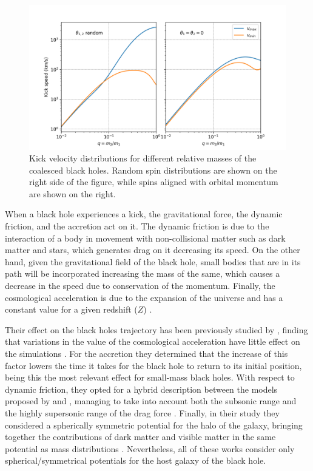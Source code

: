 	\begin{figure}[h]
		\centering
		\includegraphics[width=0.9\linewidth]{"../Files/Week 10/Tanaka"}
		\caption{Kick velocity distributions for different relative masses of the coalesced black holes. Random spin distributions are shown on the right side of the figure, while spins aligned with orbital momentum are shown on the right.}
		\label{fig: tanakaSpeeds}
	\end{figure}
	
	When a black hole experiences a kick, the gravitational force, the dynamic friction, and the accretion act on it. The dynamic friction is due to the interaction of a body in movement with non-collisional matter such as dark matter and stars, which generates drag on it decreasing its speed. On the other hand, given the gravitational field of the black hole, small bodies that are in its path will be incorporated increasing the mass of the same, which causes a decrease in the speed due to conservation of the momentum. Finally, the cosmological acceleration is due to the expansion of the universe and has a constant value for a given redshift ($Z$) \cite{choksi2017recoiling}.
	
	Their effect on the black holes trajectory has been previously studied by \citeauthor{choksi2017recoiling}, finding that variations in the value of the cosmological acceleration have little effect on the simulations \cite{choksi2017recoiling}. For the accretion they determined that the increase of this factor lowers the time it takes for the black hole to return to its initial position, being this the most relevant effect for small-mass black holes. With respect to dynamic friction, they opted for a hybrid description between the models proposed by \citeauthor{ostriker1999dynamical} and \citeauthor{escala2005role}, managing to take into account both the subsonic range and the highly supersonic range of the drag force \cite{ostriker1999dynamical, escala2005role}. Finally, in their study they considered a spherically symmetric potential for the halo of the galaxy, bringing together the contributions of dark matter and visible matter in the same potential as mass distributions \cite{choksi2017recoiling}. Nevertheless, all of these works consider only spherical/symmetrical potentials for the host galaxy of the black hole.
	
